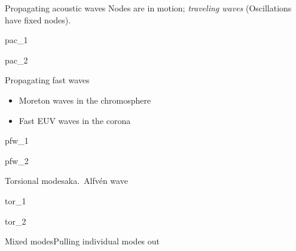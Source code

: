\documentclass[table]{beamer}
\begin{document}
\begin{frame}{Propagating acoustic waves}
    Nodes are in motion; \emph{traveling waves}
    (Oscillations have fixed nodes).
\end{frame}%
\begin{frame}{pac\_1}
\end{frame}%
\begin{frame}{pac\_2}
\end{frame}%
\begin{frame}{Propagating fast waves}
    \begin{itemize}
        \item Moreton waves in the chromosphere
        \item Fast EUV waves in the corona
    \end{itemize}
\end{frame}%
\begin{frame}{pfw\_1}
\end{frame}%
\begin{frame}{pfw\_2}
\end{frame}%
\begin{frame}{Torsional modes}{aka.\ Alfv\'en wave}
\end{frame}%
\begin{frame}{tor\_1}
\end{frame}%
\begin{frame}{tor\_2}
\end{frame}%
\begin{frame}{Mixed modes}{Pulling individual modes out}
\end{frame}%
\end{document}
